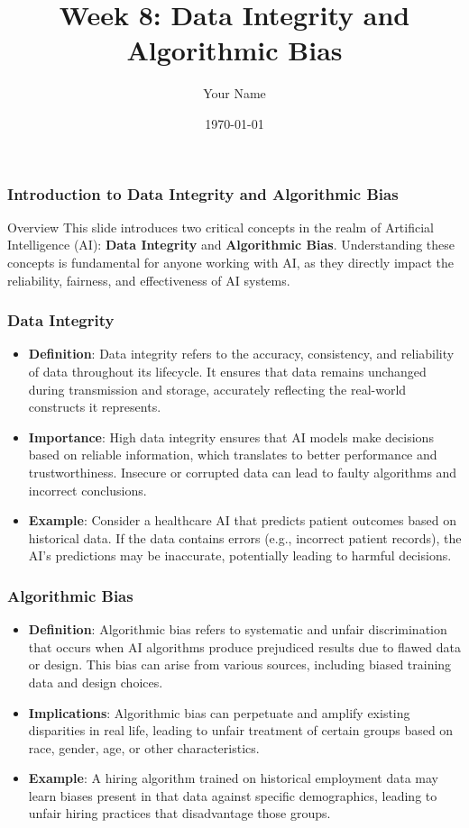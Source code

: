\documentclass{beamer}
\title{Week 8: Data Integrity and Algorithmic Bias}
\author{Your Name}
\institute{Your Institution}
\date{\today}
\begin{document}
\frame{\titlepage}

\begin{frame}[fragile]
    \frametitle{Introduction to Data Integrity and Algorithmic Bias}
    \begin{block}{Overview}
        This slide introduces two critical concepts in the realm of Artificial Intelligence (AI): \textbf{Data Integrity} and \textbf{Algorithmic Bias}. Understanding these concepts is fundamental for anyone working with AI, as they directly impact the reliability, fairness, and effectiveness of AI systems.
    \end{block}
\end{frame}

\begin{frame}[fragile]
    \frametitle{Data Integrity}
    \begin{itemize}
        \item \textbf{Definition}: Data integrity refers to the accuracy, consistency, and reliability of data throughout its lifecycle. It ensures that data remains unchanged during transmission and storage, accurately reflecting the real-world constructs it represents.
        
        \item \textbf{Importance}: High data integrity ensures that AI models make decisions based on reliable information, which translates to better performance and trustworthiness. Insecure or corrupted data can lead to faulty algorithms and incorrect conclusions.
        
        \item \textbf{Example}: Consider a healthcare AI that predicts patient outcomes based on historical data. If the data contains errors (e.g., incorrect patient records), the AI's predictions may be inaccurate, potentially leading to harmful decisions.
    \end{itemize}
\end{frame}

\begin{frame}[fragile]
    \frametitle{Algorithmic Bias}
    \begin{itemize}
        \item \textbf{Definition}: Algorithmic bias refers to systematic and unfair discrimination that occurs when AI algorithms produce prejudiced results due to flawed data or design. This bias can arise from various sources, including biased training data and design choices.
        
        \item \textbf{Implications}: Algorithmic bias can perpetuate and amplify existing disparities in real life, leading to unfair treatment of certain groups based on race, gender, age, or other characteristics.
        
        \item \textbf{Example}: A hiring algorithm trained on historical employment data may learn biases present in that data against specific demographics, leading to unfair hiring practices that disadvantage those groups.
    \end{itemize}
\end{frame}
\end{document}
